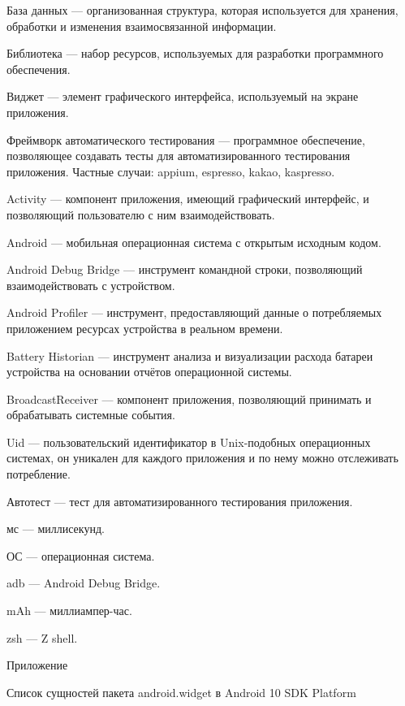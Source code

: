 \documentclass[a4paper,14pt]{extarticle} %
\begin{document}
	\newpage
	
	База данных --- организованная структура, которая используется для хранения, обработки и изменения взаимосвязанной информации.
	
	Библиотека --- набор ресурсов, используемых для разработки программного обеспечения.
	
	Виджет --- элемент графического интерфейса, используемый на экране приложения.
	
	Фреймворк автоматического тестирования --- программное обеспечение, позволяющее создавать тесты для автоматизированного тестирования приложения. Частные случаи: appium, espresso, kakao, kaspresso.
	
	Activity --- компонент приложения, имеющий графический интерфейс, и позволяющий пользователю с ним взаимодействовать.
	
	Android --- мобильная операционная система с открытым исходным кодом.
	
	Android Debug Bridge --- инструмент командной строки, позволяющий взаимодействовать с устройством.
	
	Android Profiler --- инструмент, предоставляющий данные о потребляемых приложением ресурсах устройства в реальном времени.
	
	Battery Historian --- инструмент анализа и визуализации расхода батареи устройства на основании отчётов операционной системы.
	
	BroadcastReceiver --- компонент приложения, позволяющий принимать и обрабатывать системные события.
	
	Uid --- пользовательский идентификатор в Unix-подобных операционных системах, он уникален для каждого приложения и по нему можно отслеживать потребление.

	\newpage
	
	Автотест --- тест для автоматизированного тестирования приложения.
	
	мс --- миллисекунд.
	
	ОС --- операционная система.
	
	adb --- Android Debug Bridge.
	
	mAh --- миллиампер-час.
	
	zsh --- Z shell.
	
	\newpage
	
	\printbibliography[heading=none]
	
	\newpage
	\begin{flushright}
		\label{appendix}
		Приложение\par
		Список сущностей пакета android.widget в Android 10 SDK Platform
	\end{flushright}
\end{document}
